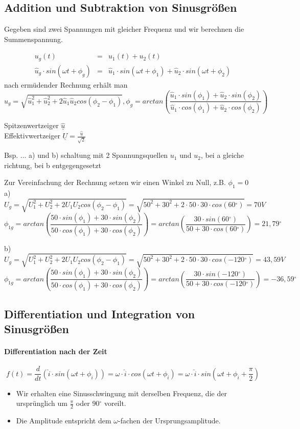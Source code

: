 \documentclass[german]{article}
\newcommand{\degree}{\ensuremath{^\circ}}
\begin{document}
\subsection{Addition und Subtraktion von Sinusgrößen}

Gegeben sind zwei Spannungen mit gleicher Frequenz und wir berechnen die Summenspannung.

\begin{eqnarray}
	u_g(t) & = & u_1(t) + u_2(t) \\
	\hat{u}_g \cdot sin(\omega t + \phi_g) & = & \hat{u}_1 \cdot sin(\omega t + \phi_1) + \hat{u}_2 \cdot sin(\omega t + \phi_2)
\end{eqnarray}
nach ermüdender Rechnung erhält man
\[ \hat{u}_g = \sqrt{\hat{u}_1^2 + \hat{u}_2^2 + 2 \hat{u}_1 \hat{u}_2 cos(\phi_2 - \phi_1)}, \phi_g = arctan\left( \frac{\hat{u}_1 \cdot sin(\phi_1) + \hat{u}_2 \cdot sin(\phi_2)}{\hat{u}_1 \cdot cos(\phi_1) + \hat{u}_2 \cdot cos(\phi_2) } \right) \]

Spitzenwertzeiger $\underline{\hat{u}}$ \\
Effektivwertzeiger $\underline{U} = \frac{\underline{\hat{u}}}{\sqrt{2}}$

Bsp. 
...
a) und b) schaltung mit 2 Spannungsquellen $u_1$ und $u_2$, bei a gleiche richtung, bei b entgegengesetzt

Zur Vereinfachung der Rechnung setzen wir einen Winkel zu Null, z.B. $\phi_1 = 0$ \\
a) \[U_g = \sqrt{U_1^2 + U_2^2 + 2 U_1 U_2 cos(\phi_2 - \phi_1)} = \sqrt{50^2 + 30^2 + 2 \cdot 50 \cdot 30 \cdot cos(60\degree)} = 70V \]
\[ \phi_{1g} = arctan\left( \frac{50 \cdot sin(\phi_1) + 30 \cdot sin(\phi_2)}{50 \cdot cos(\phi_1) + 30 \cdot cos(\phi_2)} \right) = arctan\left( \frac{30 \cdot sin(60\degree)}{50 + 30 \cdot cos(60\degree)} \right) = 21,79\degree \]

b) \[U_g = \sqrt{U_1^2 + U_2^2 + 2 U_1 U_2 cos(\phi_2 - \phi_1)} = \sqrt{50^2 + 30^2 + 2 \cdot 50 \cdot 30 \cdot cos(-120\degree)} = 43,59V \]
\[ \phi_{1g} = arctan\left( \frac{50 \cdot sin(\phi_1) + 30 \cdot sin(\phi_2)}{50 \cdot cos(\phi_1) + 30 \cdot cos(\phi_2)} \right) = arctan\left( \frac{30 \cdot sin(-120\degree)}{50 + 30 \cdot cos(-120\degree)} \right) = -36,59\degree \]

\subsection{Differentiation und Integration von Sinusgrößen}
\paragraph{Differentiation nach der Zeit}
\[ f(t) = \frac{d}{dt} ( \hat{i} \cdot sin(\omega t + \phi_i) ) = \omega \cdot \hat{i} \cdot cos(\omega t + \phi_i) = \omega \cdot \hat{i} \cdot sin(\omega t + \phi_i + \frac{\pi}2 ) \]
\begin{itemize}
	\item Wir erhalten eine Sinusschwingung mit derselben Frequenz, die der ursprünglich um $\frac{\pi}2$ oder $90\degree$ voreilt.
	\item Die Amplitude entspricht dem $\omega$-fachen der Ursprungsamplitude.
\end{itemize}
\end{document}

